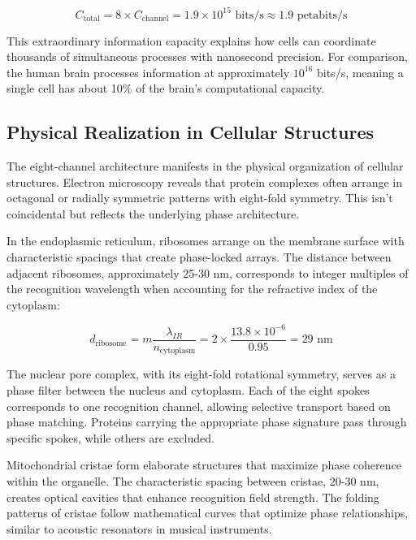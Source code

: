\documentclass[12pt,a4paper]{report}
\begin{document}
\begin{equation}
C_{\text{total}} = 8 \times C_{\text{channel}} = 1.9 \times 10^{15} \text{ bits/s} \approx 1.9 \text{ petabits/s}
\end{equation}

This extraordinary information capacity explains how cells can coordinate thousands of simultaneous processes with nanosecond precision. For comparison, the human brain processes information at approximately $10^{16}$ bits/s, meaning a single cell has about 10\% of the brain's computational capacity.

\subsection{Physical Realization in Cellular Structures}

The eight-channel architecture manifests in the physical organization of cellular structures. Electron microscopy reveals that protein complexes often arrange in octagonal or radially symmetric patterns with eight-fold symmetry. This isn't coincidental but reflects the underlying phase architecture.

In the endoplasmic reticulum, ribosomes arrange on the membrane surface with characteristic spacings that create phase-locked arrays. The distance between adjacent ribosomes, approximately 25-30 nm, corresponds to integer multiples of the recognition wavelength when accounting for the refractive index of the cytoplasm:

\begin{equation}
d_{\text{ribosome}} = m \frac{\lambda_{IR}}{n_{\text{cytoplasm}}} = 2 \times \frac{13.8 \times 10^{-6}}{0.95} = 29 \text{ nm}
\end{equation}

The nuclear pore complex, with its eight-fold rotational symmetry, serves as a phase filter between the nucleus and cytoplasm. Each of the eight spokes corresponds to one recognition channel, allowing selective transport based on phase matching. Proteins carrying the appropriate phase signature pass through specific spokes, while others are excluded.

Mitochondrial cristae form elaborate structures that maximize phase coherence within the organelle. The characteristic spacing between cristae, 20-30 nm, creates optical cavities that enhance recognition field strength. The folding patterns of cristae follow mathematical curves that optimize phase relationships, similar to acoustic resonators in musical instruments.
\end{document}
